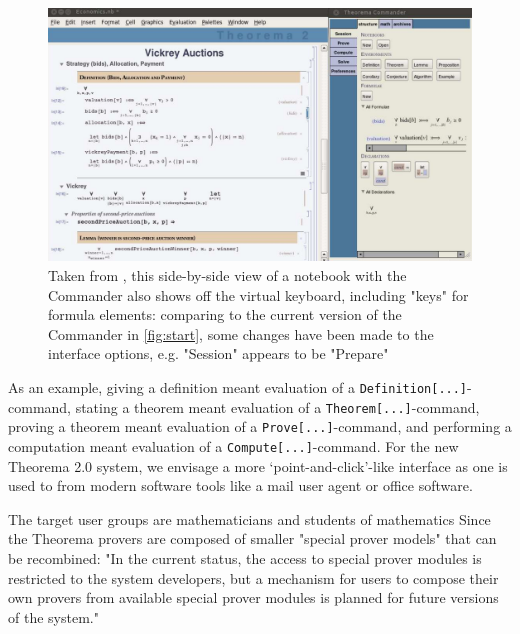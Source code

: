 \begin{figure}[h]
    \centering
    \includegraphics[scale=0.3]{images/theory/Vickrey-Auctions-Screenshot.png}
    \caption{Taken from \cite{windsteiger_theorema_2013}, this side-by-side view of a notebook with the Commander also shows off the virtual keyboard, including "keys" for formula elements: comparing to the current version of the Commander in \ref{fig:start}, some changes have been made to the interface options, e.g. "Session" appears to be "Prepare"}
    \label{fig:virtual-keyboard}
\end{figure}

\begin{displayquote}
As an example, giving a definition meant evaluation of a \lstinline+Definition[...]+-command, stating a theorem meant evaluation of a \lstinline+Theorem[...]+-command, proving a theorem meant evaluation of a \lstinline+Prove[...]+-command, and performing a computation meant evaluation of a \lstinline+Compute[...]+-command. For the new Theorema 2.0 system, we envisage a more ‘point-and-click’-like interface as one is used to from modern software tools like a mail user agent or office software.
\cite[p. 73]{windsteiger_theorema_2013}
\end{displayquote}

The target user groups are mathematicians and students of mathematics \cite[p. 73]{windsteiger_theorema_2013} Since the Theorema provers are composed of smaller "special prover models" that can be recombined: "In the current status, the access to special prover modules is restricted to the system developers, but a mechanism for users to compose their own provers from available special prover modules is planned for future versions of the system." \cite[p. 111]{g_mayrhofer_s_saminger__w_winsteiger_theorema_nodate}


